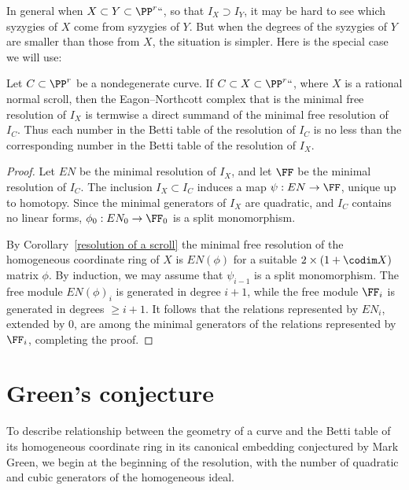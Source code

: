In general when $X\subset Y\subset \PP^r` `$, so that $I_X \supset I_Y$,
it may be hard to see which syzygies of $X$ come
from syzygies of $Y$. But when the degrees of the syzygies of $Y$ are
smaller than those from $X$, the situation is simpler.
Here is the special case we will use:

\begin{proposition}\label{containment of resolutions}
Let $C\subset \PP^r$ be
a nondegenerate curve. If $C\subset X
\subset \PP^r` `$, where $X$ is a rational
%
normal scroll, then the Eagon--Northcott complex that is  the minimal
free resolution of $I_X$ is termwise a direct summand
of the minimal free resolution of $I_C$. Thus each number in the Betti table of the
%
resolution of $I_C$ is  
no less than
the corresponding number in the Betti table of the resolution of $I_X$.
\unif
\end{proposition}

\begin{proof}
Let $EN$ be the minimal resolution of $I_X$, and let $\FF$ be the minimal
resolution of $I_C$.
The inclusion $I_X \subset I_C$ induces a map $\psi: EN\to \FF$, unique
up to homotopy. Since the minimal generators of $I_X$ are quadratic,
and $I_C$ contains no linear forms, $\phi_0: EN_0\to \FF_0$ is a split
monomorphism.

By Corollary~\ref{resolution of a scroll} the minimal free resolution of the homogeneous
coordinate ring of $X$ is $EN(\phi)$ for a suitable $2\times (1+\codim X)$ matrix $\phi$.
By induction, we may assume that $\psi_{i-1}$ is a split monomorphism. The
free module $EN(\phi)_{i}$ is generated in
degree $i+1$, while the free module $\FF_i$ is generated in degrees
$\geq i+1$. It follows that the relations
represented by $EN_i$, extended by 0, are among the minimal generators
of the relations represented by $\FF_i$,
completing the proof.
\end{proof}

\section{Green's conjecture}
\label{Greenconj}

To describe relationship between the geometry of
a curve and the Betti table of its homogeneous coordinate ring
in its canonical embedding
conjectured by Mark Green,
%
 we 
begin
at the beginning of the resolution, with 
the number of quadratic and cubic generators of the homogeneous ideal.


